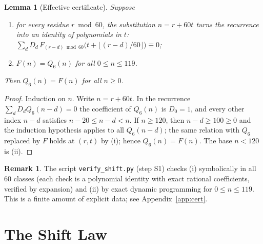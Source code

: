 \documentclass[11pt,reqno]{article}
\newtheorem{lemma}[theorem]{Lemma}
\theoremstyle{definition}
\newtheorem{remark}[theorem]{Remark}
\begin{document}
\begin{lemma}[Effective certificate]\label{lem:qp-cert}
Suppose
\begin{enumerate}
\item[(i)] for every residue $r\bmod 60$, the substitution $n=r+60t$ turns the recurrence into an identity of polynomials in $t$:
$\sum_d D_d\,F_{(r-d)\bmod 60}\bigl(t+\lfloor (r-d)/60\rfloor\bigr)\equiv 0$;
\item[(ii)] $F(n)=Q_6(n)$ for all $0\le n\le119$.
\end{enumerate}
Then $Q_6(n)=F(n)$ for all $n\ge0$.
\end{lemma}
\begin{proof}
Induction on $n$. Write $n=r+60t$. In the recurrence $\sum_d D_d Q_6(n-d)=0$ the coefficient of $Q_6(n)$ is $D_0=1$, and every other index $n-d$ satisfies $n-20\le n-d<n$. If $n\ge 120$, then $n-d\ge 100\ge0$ and the induction hypothesis applies to all $Q_6(n-d)$; the same relation with $Q_6$ replaced by $F$ holds at $(r,t)$ by (i); hence $Q_6(n)=F(n)$. The base $n<120$ is (ii).
\end{proof}

\begin{remark}\label{rem:S1}
The script \texttt{verify\_shift.py} (step S1) checks (i) symbolically in all $60$ classes (each check is a polynomial identity with exact rational coefficients, verified by expansion) and (ii) by exact dynamic programming for $0\le n\le119$. This is a finite amount of explicit data; see Appendix~\ref{app:cert}.
\end{remark}

\section{The Shift Law}\label{sec:shift}
\end{document}

